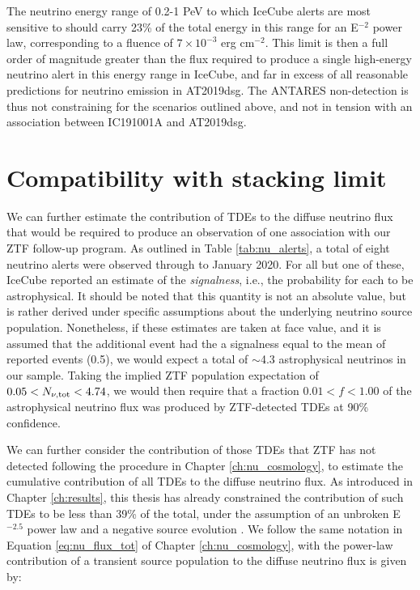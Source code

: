 The neutrino energy range of 0.2-1 PeV to which IceCube alerts are most sensitive to should carry 23\% of the total energy in this range for an E$^{-2}$ power law, corresponding to a fluence of $7 \times 10^{-3}$ erg cm$^{−2}$. This limit is then a full order of magnitude greater than the flux required to produce a single high-energy neutrino alert in this energy range in IceCube, and far in excess of all reasonable predictions for neutrino emission in AT2019dsg. The ANTARES non-detection is thus not constraining for the scenarios outlined above, and not in tension with an association between IC191001A and AT2019dsg.

\section{Compatibility with stacking limit}
\label{sec:diffuse}

We can further estimate the contribution of TDEs to the diffuse neutrino flux that would be required to produce an observation of one association with our ZTF follow-up program. As outlined in Table \ref{tab:nu_alerts}, a total of eight neutrino alerts were observed through to January 2020. For all but one of these, IceCube reported an estimate of the \emph{signalness}, i.e., the probability for each to be astrophysical. It should be noted that this quantity is not an absolute value, but is rather derived under specific assumptions about the underlying neutrino source population. Nonetheless, if these estimates are taken at face value, and it is assumed that the additional event had the a signalness equal to the mean of reported events (0.5), we would expect a total of $\sim$4.3 astrophysical neutrinos in our sample. Taking the implied ZTF population expectation of $0.05 < N_{\nu, \textup{tot}} < 4.74$, we would then require that a fraction $0.01 < f < 1.00$ of the astrophysical neutrino flux was produced by ZTF-detected TDEs at 90\% confidence.

We can further consider the contribution of those TDEs that ZTF has not detected following the procedure in Chapter \ref{ch:nu_cosmology}, to  estimate the cumulative contribution of all TDEs to the diffuse neutrino flux. As introduced in Chapter \ref{ch:results}, this thesis has already constrained the contribution of such TDEs to be less than 39\% of the total, under the assumption of an unbroken E$^{-2.5}$ power law and a negative source evolution . We follow the same notation in Equation \ref{eq:nu_flux_tot} of Chapter \ref{ch:nu_cosmology}, with the power-law contribution of a transient source population to the diffuse neutrino flux is given by:

